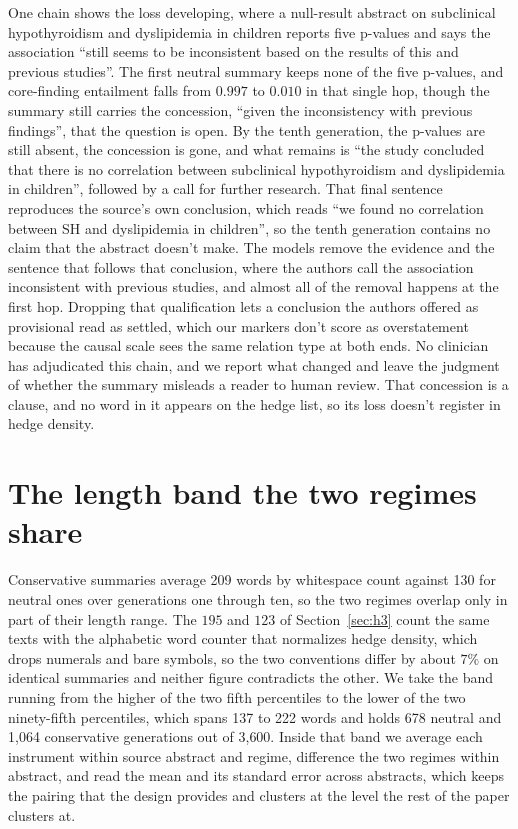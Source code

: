 \documentclass{article}
\begin{document}
One chain shows the loss developing, where a null-result abstract on subclinical hypothyroidism and dyslipidemia in children reports five p-values and says the association ``still seems to be inconsistent based on the results of this and previous studies''. The first neutral summary keeps none of the five p-values, and core-finding entailment falls from $0.997$ to $0.010$ in that single hop, though the summary still carries the concession, ``given the inconsistency with previous findings'', that the question is open. By the tenth generation, the p-values are still absent, the concession is gone, and what remains is ``the study concluded that there is no correlation between subclinical hypothyroidism and dyslipidemia in children'', followed by a call for further research. That final sentence reproduces the source's own conclusion, which reads ``we found no correlation between SH and dyslipidemia in children'', so the tenth generation contains no claim that the abstract doesn't make. The models remove the evidence and the sentence that follows that conclusion, where the authors call the association inconsistent with previous studies, and almost all of the removal happens at the first hop. Dropping that qualification lets a conclusion the authors offered as provisional read as settled, which our markers don't score as overstatement because the causal scale sees the same relation type at both ends. No clinician has adjudicated this chain, and we report what changed and leave the judgment of whether the summary misleads a reader to human review. That concession is a clause, and no word in it appears on the hedge list, so its loss doesn't register in hedge density.

\section{The length band the two regimes share}
\label{app:length}

Conservative summaries average 209 words by whitespace count against 130 for neutral ones over generations one through ten, so the two regimes overlap only in part of their length range. The $195$ and $123$ of Section~\ref{sec:h3} count the same texts with the alphabetic word counter that normalizes hedge density, which drops numerals and bare symbols, so the two conventions differ by about $7\%$ on identical summaries and neither figure contradicts the other. We take the band running from the higher of the two fifth percentiles to the lower of the two ninety-fifth percentiles, which spans 137 to 222 words and holds 678 neutral and 1{,}064 conservative generations out of 3{,}600. Inside that band we average each instrument within source abstract and regime, difference the two regimes within abstract, and read the mean and its standard error across abstracts, which keeps the pairing that the design provides and clusters at the level the rest of the paper clusters at.
\end{document}
